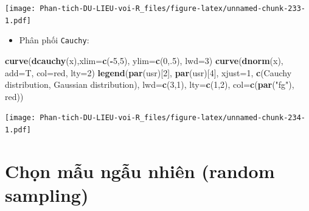 \documentclass[
]{book}
\newenvironment{Shaded}{\begin{snugshade}}{\end{snugshade}}
\newcommand{\DataTypeTok}[1]{\textcolor[rgb]{0.13,0.29,0.53}{#1}}
\newcommand{\DecValTok}[1]{\textcolor[rgb]{0.00,0.00,0.81}{#1}}
\newcommand{\KeywordTok}[1]{\textcolor[rgb]{0.13,0.29,0.53}{\textbf{#1}}}
\newcommand{\NormalTok}[1]{#1}
\newcommand{\OperatorTok}[1]{\textcolor[rgb]{0.81,0.36,0.00}{\textbf{#1}}}
\newcommand{\StringTok}[1]{\textcolor[rgb]{0.31,0.60,0.02}{#1}}
\providecommand{\tightlist}{%
  \setlength{\itemsep}{0pt}\setlength{\parskip}{0pt}}
\begin{document}
\texttt{[image: Phan-tich-DU-LIEU-voi-R\_files/figure-latex/unnamed-chunk-233-1.pdf]}

\begin{itemize}
\tightlist
\item
  Phân phối \texttt{Cauchy}:
\end{itemize}

\begin{Shaded}
\begin{Highlighting}[]
\KeywordTok{curve}\NormalTok{(}\KeywordTok{dcauchy}\NormalTok{(x),}\DataTypeTok{xlim=}\KeywordTok{c}\NormalTok{(}\OperatorTok{{-}}\DecValTok{5}\NormalTok{,}\DecValTok{5}\NormalTok{), }\DataTypeTok{ylim=}\KeywordTok{c}\NormalTok{(}\DecValTok{0}\NormalTok{,.}\DecValTok{5}\NormalTok{), }\DataTypeTok{lwd=}\DecValTok{3}\NormalTok{)}
\KeywordTok{curve}\NormalTok{(}\KeywordTok{dnorm}\NormalTok{(x), }\DataTypeTok{add=}\NormalTok{T, }\DataTypeTok{col=}\StringTok{\textquotesingle{}red\textquotesingle{}}\NormalTok{, }\DataTypeTok{lty=}\DecValTok{2}\NormalTok{)}
\KeywordTok{legend}\NormalTok{(}\KeywordTok{par}\NormalTok{(}\StringTok{\textquotesingle{}usr\textquotesingle{}}\NormalTok{)[}\DecValTok{2}\NormalTok{], }\KeywordTok{par}\NormalTok{(}\StringTok{\textquotesingle{}usr\textquotesingle{}}\NormalTok{)[}\DecValTok{4}\NormalTok{], }\DataTypeTok{xjust=}\DecValTok{1}\NormalTok{,}
        \KeywordTok{c}\NormalTok{(}\StringTok{\textquotesingle{}Cauchy distribution\textquotesingle{}}\NormalTok{, }\StringTok{\textquotesingle{}Gaussian distribution\textquotesingle{}}\NormalTok{),}
        \DataTypeTok{lwd=}\KeywordTok{c}\NormalTok{(}\DecValTok{3}\NormalTok{,}\DecValTok{1}\NormalTok{),}
        \DataTypeTok{lty=}\KeywordTok{c}\NormalTok{(}\DecValTok{1}\NormalTok{,}\DecValTok{2}\NormalTok{),}
        \DataTypeTok{col=}\KeywordTok{c}\NormalTok{(}\KeywordTok{par}\NormalTok{(}\StringTok{"fg"}\NormalTok{), }\StringTok{\textquotesingle{}red\textquotesingle{}}\NormalTok{))}
\end{Highlighting}
\end{Shaded}

\texttt{[image: Phan-tich-DU-LIEU-voi-R\_files/figure-latex/unnamed-chunk-234-1.pdf]}

\hypertarget{chux1ecdn-mux1eabu-ngux1eabu-nhiuxean-random-sampling}{%
\section{Chọn mẫu ngẫu nhiên (random sampling)}\label{chux1ecdn-mux1eabu-ngux1eabu-nhiuxean-random-sampling}}
\end{document}
